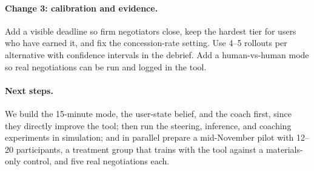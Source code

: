 \documentclass[10pt]{article}
\begin{document}
\paragraph{Change 3: calibration and evidence.} Add a visible deadline so firm negotiators
close, keep the hardest tier for users who have earned it, and fix the concession-rate
setting. Use 4--5 rollouts per alternative with confidence intervals in the debrief. Add a
human-vs-human mode so real negotiations can be run and logged in the tool.

\paragraph{Next steps.} We build the 15-minute mode, the user-state belief, and the coach
first, since they directly improve the tool; then run the steering, inference, and
coaching experiments in simulation; and in parallel prepare a mid-November pilot with
12--20 participants, a treatment group that trains with the tool against a materials-only
control, and five real negotiations each.
\end{document}
